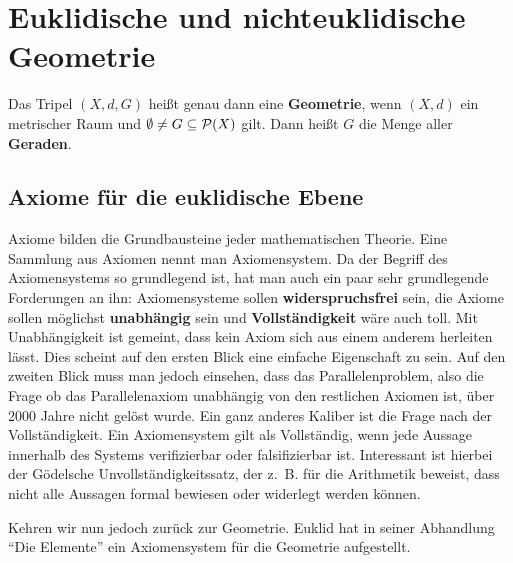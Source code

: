 \chapter{Euklidische und nichteuklidische Geometrie}

\begin{definition}%
    Das Tripel $(X, d, G)$ heißt genau dann eine \textbf{Geometrie},
    wenn $(X, d)$ ein metrischer Raum und $\emptyset \neq G \subseteq \mathcal{P}(X)$
    gilt. Dann heißt $G$ die Menge aller \textbf{Geraden}.
\end{definition}

\section{Axiome für die euklidische Ebene}
Axiome bilden die Grundbausteine jeder mathematischen Theorie. Eine
Sammlung aus Axiomen nennt man Axiomensystem.
Da der Begriff des Axiomensystems so grundlegend ist, hat man auch
ein paar sehr grundlegende Forderungen an ihn: Axiomensysteme sollen
\textbf{widerspruchsfrei} sein, die Axiome sollen möglichst
\textbf{unabhängig} sein und \textbf{Vollständigkeit} wäre auch toll.
Mit Unabhängigkeit ist gemeint, dass kein Axiom sich aus einem anderem
herleiten lässt. Dies scheint auf den ersten Blick eine einfache
Eigenschaft zu sein. Auf den zweiten Blick muss man jedoch einsehen,
dass das Parallelenproblem, also die Frage ob das Parallelenaxiom
unabhängig von den restlichen Axiomen ist, über 2000 Jahre nicht
gelöst wurde. Ein ganz anderes Kaliber ist die Frage nach der
Vollständigkeit. Ein Axiomensystem gilt als Vollständig, wenn
jede Aussage innerhalb des Systems verifizierbar oder falsifizierbar
ist. Interessant ist hierbei der Gödelsche Unvollständigkeitssatz,
der z.~B. für die Arithmetik beweist, dass nicht alle Aussagen
formal bewiesen oder widerlegt werden können.

Kehren wir nun jedoch zurück zur Geometrie. Euklid hat in seiner
Abhandlung \enquote{Die Elemente} ein Axiomensystem für die Geometrie
aufgestellt.

